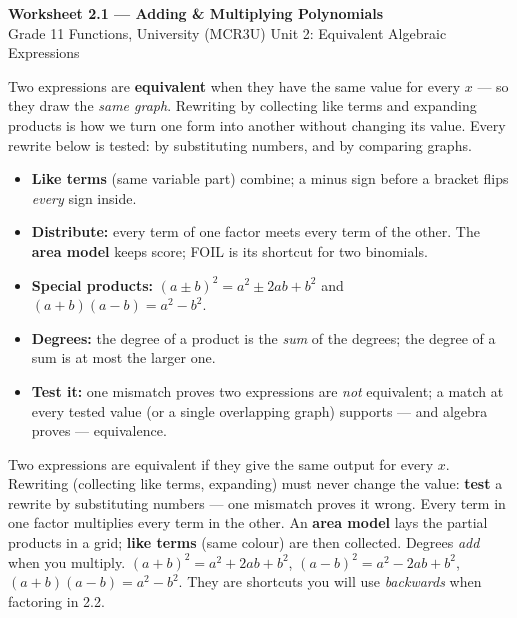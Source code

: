 \documentclass[11pt]{article}
\begin{document}
\begin{center}
{\LARGE\bfseries\color{titleblue}Worksheet 2.1 --- Adding \& Multiplying Polynomials}\\[2pt]
{\small Grade 11 Functions, University (MCR3U) \textperiodcentered{} Unit 2: Equivalent Algebraic Expressions}
\end{center}

\begin{ideabox}
Two expressions are \textbf{equivalent} when they have the same value for every $x$ --- so they draw the \emph{same graph}. Rewriting by collecting like terms and expanding products is how we turn one form into another without changing its value. Every rewrite below is tested: by substituting numbers, and by comparing graphs.
\begin{itemize}[leftmargin=*,itemsep=2pt]
  \item \textbf{Like terms} (same variable part) combine; a minus sign before a bracket flips \emph{every} sign inside.
  \item \textbf{Distribute:} every term of one factor meets every term of the other. The \textbf{area model} keeps score; FOIL is its shortcut for two binomials.
  \item \textbf{Special products:} $(a\pm b)^2=a^2\pm2ab+b^2$ and $(a+b)(a-b)=a^2-b^2$.
  \item \textbf{Degrees:} the degree of a product is the \emph{sum} of the degrees; the degree of a sum is at most the larger one.
  \item \textbf{Test it:} one mismatch proves two expressions are \emph{not} equivalent; a match at every tested value (or a single overlapping graph) supports --- and algebra proves --- equivalence.
\end{itemize}
\end{ideabox}

\begin{learnbox}
Two expressions are equivalent if they give the same output for every $x$. Rewriting (collecting like terms, expanding) must never change the value: \textbf{test} a rewrite by substituting numbers --- one mismatch proves it wrong.
Every term in one factor multiplies every term in the other. An \textbf{area model} lays the partial products in a grid; \textbf{like terms} (same colour) are then collected. Degrees \emph{add} when you multiply.
$(a+b)^2=a^2+2ab+b^2$, $(a-b)^2=a^2-2ab+b^2$, $(a+b)(a-b)=a^2-b^2$. They are shortcuts you will use \emph{backwards} when factoring in 2.2.
\end{learnbox}
\end{document}
